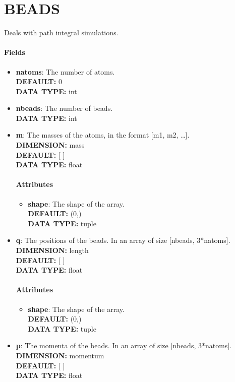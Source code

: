 \section{BEADS}
\label{BEADS}
Deals with path integral simulations.
\paragraph{Fields}
 \begin{itemize}
\item {\bf natoms}:
 The number of atoms.
{\\ \bf DEFAULT: }0
{\\ \bf DATA TYPE: }int
\item {\bf nbeads}:
 The number of beads.
{\\ \bf DATA TYPE: }int
\item {\bf m}:
 The masses of the atoms, in the format [m1, m2, \ldots  ].
{\\ \bf DIMENSION: }mass
{\\ \bf DEFAULT: }[ ]
{\\ \bf DATA TYPE: }float
\paragraph{Attributes}
 \begin{itemize}
\item {\bf shape}:
 The shape of the array.
{\\ \bf DEFAULT: }(0,)
{\\ \bf DATA TYPE: }tuple
\end{itemize}
 
\item {\bf q}:
 The positions of the beads. In an array of size [nbeads, 3*natoms].
{\\ \bf DIMENSION: }length
{\\ \bf DEFAULT: }[ ]
{\\ \bf DATA TYPE: }float
\paragraph{Attributes}
 \begin{itemize}
\item {\bf shape}:
 The shape of the array.
{\\ \bf DEFAULT: }(0,)
{\\ \bf DATA TYPE: }tuple
\end{itemize}
 
\item {\bf p}:
 The momenta of the beads. In an array of size [nbeads, 3*natoms].
{\\ \bf DIMENSION: }momentum
{\\ \bf DEFAULT: }[ ]
{\\ \bf DATA TYPE: }float

\end{itemize}
